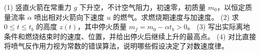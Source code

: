 (1) 竖直火箭在常重力 \(g\) 下升空，不计空气阻力，初速零，初质量 \(m_0\)，以恒定质量流率 \(\alpha\) 喷出相对火箭向下速度 \(u\) 的燃气。求燃烧期速度与加速度。
(2) 求 \(0\le t\le t_b\) 的高度 \(z(t)\)，其中停火质量 \(m_f=m_0-\alpha t_b>0\)。
(3) 写出实际离地条件和燃烧结束时的速度、位置，并给出停火后继续上升的最高点。
(4) 对比直接将喷气反作用力视为常数的错误算法，说明哪些假设决定了对数速度律。
